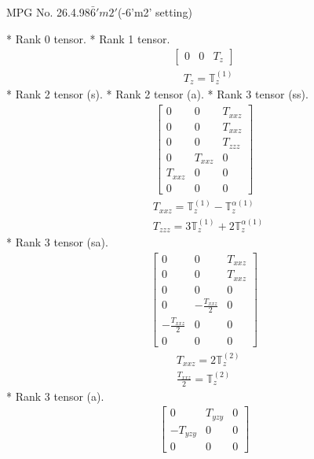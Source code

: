 \documentclass[fleqn,8pt,landscape]{jsarticle}
\begin{document}
\setcounter{MaxMatrixCols}{32}

\renewcommand{\tablename}{Table~}
\renewcommand{\figurename}{Figure~}
\begin{center}
\LARGE
MPG No. 26.4.98\quad$\bar{6}'m2'$\quad(-6'm2' setting)
\end{center}
* Rank 0 tensor.
* Rank 1 tensor.
\begin{align*}
\begin{bmatrix} 0 & 0 & T_{z} \end{bmatrix}
\end{align*}
\begin{align*}
& T_{z} = \mathbb{T}_{z}^{(1)}
\end{align*}
* Rank 2 tensor (s).
* Rank 2 tensor (a).
* Rank 3 tensor (ss).
\begin{align*}
\begin{bmatrix} 0 & 0 & T_{xxz} \\ 0 & 0 & T_{xxz} \\ 0 & 0 & T_{zzz} \\ 0 & T_{xxz} & 0 \\ T_{xxz} & 0 & 0 \\ 0 & 0 & 0 \end{bmatrix}
\end{align*}
\begin{align*}
& T_{xxz} = \mathbb{T}_{z}^{(1)} - \mathbb{T}_{z}^{\alpha(1)} \\
& T_{zzz} = 3 \mathbb{T}_{z}^{(1)} + 2 \mathbb{T}_{z}^{\alpha(1)}
\end{align*}
* Rank 3 tensor (sa).
\begin{align*}
\begin{bmatrix} 0 & 0 & T_{xxz} \\ 0 & 0 & T_{xxz} \\ 0 & 0 & 0 \\ 0 & - \frac{T_{xxz}}{2} & 0 \\ - \frac{T_{xxz}}{2} & 0 & 0 \\ 0 & 0 & 0 \end{bmatrix}
\end{align*}
\begin{align*}
& T_{xxz} = 2 \mathbb{T}_{z}^{(2)} \\
& \frac{T_{xxz}}{2} = \mathbb{T}_{z}^{(2)}
\end{align*}
* Rank 3 tensor (a).
\begin{align*}
\begin{bmatrix} 0 & T_{yzy} & 0 \\ - T_{yzy} & 0 & 0 \\ 0 & 0 & 0 \end{bmatrix}
\end{align*}
\end{document}
